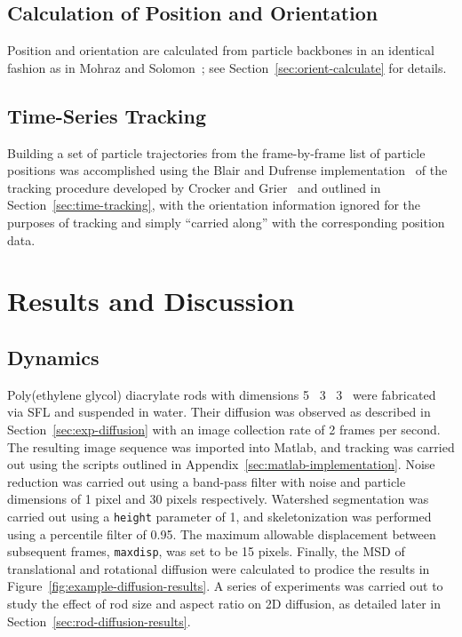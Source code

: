 \subsection{Calculation of Position and Orientation}

Position and orientation are calculated from particle backbones 
in an identical fashion as in Mohraz and Solomon~\cite{rods-mohraz}; see
Section~\ref{sec:orient-calculate} for details.

\subsection{Time-Series Tracking}

Building a set of particle trajectories from the frame-by-frame list of particle positions
was accomplished using the Blair and Dufrense implementation~\cite{blair-dufrense-matlab} of 
the tracking procedure developed by Crocker and Grier~\cite{crocker-grier-spheres} and outlined 
in Section~\ref{sec:time-tracking}, with the orientation information ignored for the purposes of
tracking and simply ``carried along'' with the corresponding position data.


\section{Results and Discussion}
\label{sec:track-results}

\subsection{Dynamics}


Poly(ethylene glycol) diacrylate rods with dimensions 5 \by~3 \by~3 \microns~were fabricated via 
SFL and suspended in 
water. Their diffusion was observed as described in Section~\ref{sec:exp-diffusion} with an 
image collection
rate of 2 
frames per second.  The resulting image sequence was imported into Matlab, and tracking was carried out
using the scripts outlined in Appendix~\ref{sec:matlab-implementation}.  Noise reduction was carried out using 
a band-pass filter with noise and particle dimensions of 1 pixel and 30 pixels respectively. 
Watershed segmentation was carried out using a \texttt{height} parameter of 1, and skeletonization
was performed using a percentile filter of 0.95.  The maximum allowable 
displacement between subsequent frames, \texttt{maxdisp}, was set to be 15 pixels.  Finally, the 
MSD of translational and rotational diffusion were calculated to prodice the results in 
Figure~\ref{fig:example-diffusion-results}.  
A series of experiments was carried out to study the effect of rod size and aspect ratio on 2D diffusion, as 
detailed later in Section~\ref{sec:rod-diffusion-results}.

